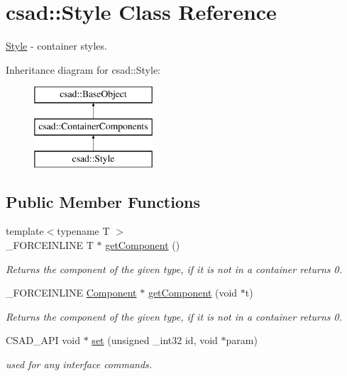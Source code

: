 \hypertarget{classcsad_1_1_style}{\section{csad\-:\-:Style Class Reference}
\label{classcsad_1_1_style}
}


\hyperlink{classcsad_1_1_style}{Style} -\/ container styles.  


Inheritance diagram for csad\-:\-:Style\-:\begin{figure}[H]
\begin{center}
\leavevmode
\includegraphics[height=3.000000cm]{classcsad_1_1_style}
\end{center}
\end{figure}
\subsection*{Public Member Functions}
\begin{DoxyCompactItemize}
\item 
\hypertarget{classcsad_1_1_style_abf5aa6a96ac8c40378b8acdafca4875a}{{\footnotesize template$<$typename T $>$ }\\\-\_\-\-F\-O\-R\-C\-E\-I\-N\-L\-I\-N\-E T $\ast$ \hyperlink{classcsad_1_1_style_abf5aa6a96ac8c40378b8acdafca4875a}{get\-Component} ()}\label{classcsad_1_1_style_abf5aa6a96ac8c40378b8acdafca4875a}

\begin{DoxyCompactList}\small\item\em Returns the component of the given type, if it is not in a container returns 0. \end{DoxyCompactList}\item 
\hypertarget{classcsad_1_1_style_a67ccaa9e84a17c49da5dec3b8c78c833}{\-\_\-\-F\-O\-R\-C\-E\-I\-N\-L\-I\-N\-E \hyperlink{classcsad_1_1_component}{Component} $\ast$ \hyperlink{classcsad_1_1_style_a67ccaa9e84a17c49da5dec3b8c78c833}{get\-Component} (void $\ast$t)}\label{classcsad_1_1_style_a67ccaa9e84a17c49da5dec3b8c78c833}

\begin{DoxyCompactList}\small\item\em Returns the component of the given type, if it is not in a container returns 0. \end{DoxyCompactList}\item 
\hypertarget{classcsad_1_1_style_a97213ecf688a3ea39a8d931e3351b211}{C\-S\-A\-D\-\_\-\-A\-P\-I void $\ast$ \hyperlink{classcsad_1_1_style_a97213ecf688a3ea39a8d931e3351b211}{set} (unsigned \-\_\-int32 id, void $\ast$param)}\label{classcsad_1_1_style_a97213ecf688a3ea39a8d931e3351b211}

\begin{DoxyCompactList}\small\item\em used for any interface commands. \end{DoxyCompactList}\end{DoxyCompactItemize}
